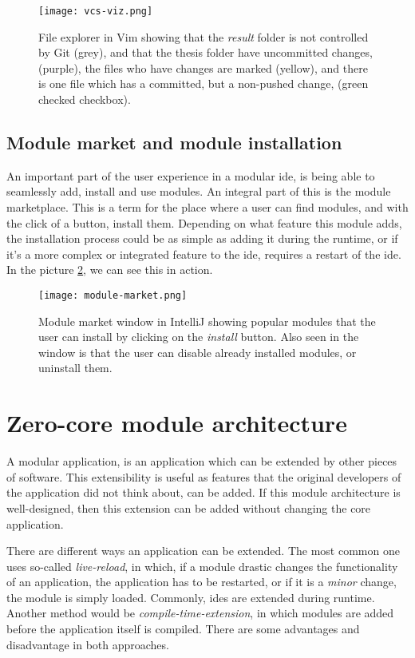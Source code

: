 \begin{figure}
  \centering
  \texttt{[image: vcs-viz.png]}
  \caption{
    File explorer in Vim showing that the \textit{result} folder is not
    controlled by Git (grey), and that the thesis folder have uncommitted
    changes, (purple), the files who have changes are marked (yellow), and there
    is one file which has a committed, but a non-pushed change, (green checked
    checkbox).
  }
  \label{pic:vcsViz}
\end{figure}

\subsection{Module market and module installation}

An important part of the user experience in a modular \gls*{ide}, is being able
to seamlessly add, install and use modules. An integral part of this is the
module marketplace. This is a term for the place where a user can find modules,
and with the click of a button, install them. Depending on what feature this
module adds, the installation process could be as simple as adding it during the
runtime, or if it's a more complex or integrated feature to the \gls*{ide},
requires a restart of the \gls*{ide}. In the picture \ref{pic:market}, we can see
this in action.

\begin{figure}
  \centering
  \texttt{[image: module-market.png]}
  \caption{
    Module market window in IntelliJ showing popular modules that the user can
    install by clicking on the \textit{install} button. Also seen in the window is
    that the user can disable already installed modules, or uninstall them.
  }
  \label{pic:market}
\end{figure}


\section{Zero-core module architecture} \label{sec:architecture}

A modular application, is an application which can be extended by other pieces
of software. This extensibility is useful as features that the original
developers of the application did not think about, can be added. If this module
architecture is well-designed, then this extension can be added without changing
the core application.

There are different ways an application can be extended. The most common one
uses so-called \textit{live-reload}, in which, if a module drastic changes the
functionality of an application, the application has to be restarted, or if it
is a \textit{minor} change, the module is simply loaded. Commonly, \gls*{ide}s
are extended during runtime. Another method would be
\textit{compile-time-extension}, in which modules are added before the
application itself is compiled. There are some advantages and disadvantage in
both approaches.

